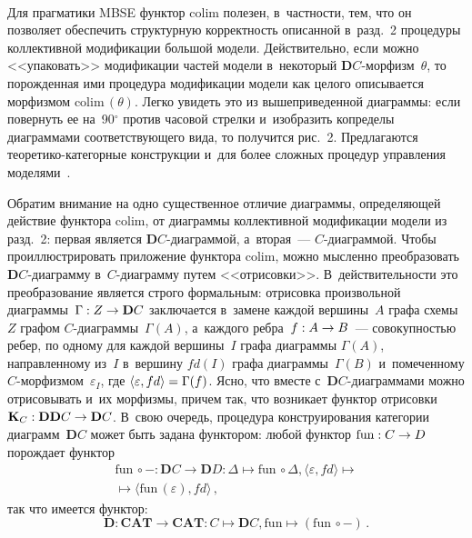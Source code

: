 \begin{multicols}{2}
\vspace*{6pt}
   \begin{center}
   \vspace*{1pt}
 \mbox{%
 \epsfxsize=54.085mm 
 }
 \end{center}

\vspace*{6pt}


   Для прагматики MBSE функтор $\mathrm{colim}$ полезен, в~частности, тем, что он 
позволяет обеспечить структурную корректность описанной в~разд.~2\linebreak 
процедуры коллективной модификации большой модели. Действительно, если 
можно <<упаковать>> модификации частей модели в~некоторый 
$\mathbf{D}C$-мор\-физм~$\theta$, то порожденная ими процедура 
модификации модели как целого описывается морфизмом $\mathrm{colim}\,(\theta)$. Легко 
увидеть это из вышеприведенной диаграммы: если повернуть ее на~90$^\circ$ 
против часовой стрелки и~изобразить копределы диаграммами 
соответствующего вида, то получится рис.~2. Предлагаются  
тео\-ре\-ти\-ко-ка\-те\-гор\-ные конструкции и~для более сложных процедур 
управления моделями~\cite{8-kov}.
   
   Обратим внимание на одно существенное отличие диаграммы, 
определяющей действие функтора $\mathrm{colim}$, от диаграммы коллективной 
модификации модели из разд.~2: первая является  
$\mathbf{D}C$-диа\-грам\-мой, а~вторая~--- $C$-диа\-грам\-мой. Чтобы 
проиллюстрировать приложение функтора $\mathrm{colim}$, можно мысленно 
преобразовать $\mathbf{D}C$-диа\-грам\-му в~$C$-диа\-грам\-му путем 
<<отрисовки>>. В~действительности это преобразование является строго 
формальным: отрисовка произвольной диаграммы~$\Gamma : Z\hm\to 
\mathbf{D}C$ заключается в~замене каждой вершины~$A$ графа схемы~$Z$ 
графом $C$-диа\-грам\-мы~$\Gamma(A)$, а~каждого ребра~$f : A\hm\to B$~---
совокупностью ребер, по одному для каждой вершины~$I$ графа диаграммы 
$\Gamma (A)$, направленному из~$I$ в~вершину $fd(I)$ графа 
диаграммы~$\Gamma(B)$ и~помеченному $C$-мор\-физ\-мом~$\varepsilon_I$, 
где $\langle \varepsilon, fd\rangle \hm= \Gamma(f)$. Ясно, что вместе 
   с~$\mathbf{D}C$-диа\-грам\-ма\-ми можно отрисовывать и~их морфизмы, 
причем так, что возникает функтор отрисовки~$\mathbf{K}_C: 
\mathbf{DD}C\hm\to  \mathbf{D}C$. В~свою очередь, процедура 
конструирования категории диаграмм~$\mathbf{D}C$ может быть задана 
функтором: любой функтор $\mathrm{fun}: C\hm\to D$ порождает функтор
  \begin{multline*}
\mathrm{fun}\, \circ - : \mathbf{D}C \to \mathbf{D}D : \Delta \mapsto 
\mathrm{fun}\, \circ \Delta, 
\langle\varepsilon, fd\rangle\mapsto{}\\
{}\mapsto \langle \mathrm{fun}\,(\varepsilon), fd\rangle\,,
\end{multline*}
так что имеется функтор:
$$
\mathbf{D}: \mathbf{CAT} \to \mathbf{CAT}: C \mapsto \mathbf{D}C, \mathrm{fun} 
\mapsto (\mathrm{fun}\, \circ -)\,.
$$
   

\end{multicols}

